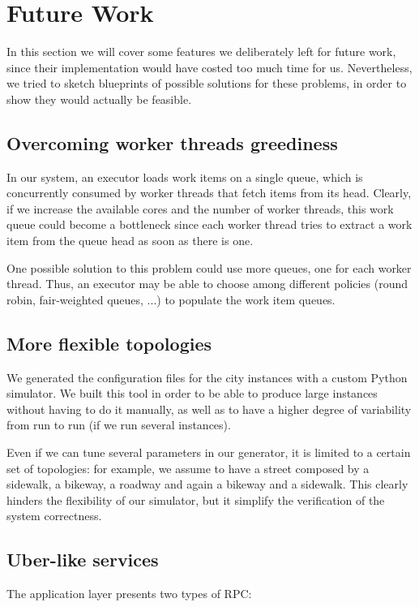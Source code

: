 \section{Future Work}
In this section we will cover some features we deliberately left for future
work, since their implementation would have costed too much time for us.
Nevertheless, we tried to sketch blueprints of possible solutions for these
problems, in order to show they would actually be feasible.

\subsection{Overcoming worker threads greediness}
In our system, an executor loads work items on a single queue, which is
concurrently consumed by worker threads that fetch items from its head.
Clearly, if we increase the available cores and the number of worker threads,
this work queue could become a bottleneck since each worker thread tries to
extract a work item from the queue head as soon as there is one.

One possible solution to this problem could use more queues, one for
each worker thread. Thus, an executor may be able to choose among
different policies (round robin, fair-weighted queues, ...) to populate the
work item queues.

\subsection{More flexible topologies}
We generated the configuration files for the city instances with a custom
Python simulator. We built this tool in order to be able to produce large
instances without having to do it manually, as well as to have a higher degree
of variability from run to run (if we run several instances).

Even if we can tune several parameters in our generator, it is limited to a
certain set of topologies: for example, we assume to have a street composed by
a sidewalk, a bikeway, a roadway and again a bikeway and a sidewalk.
This clearly hinders the flexibility of our simulator, but it simplify
the verification of the system correctness.

\subsection{Uber-like services}\label{sec:future-uber}
The application layer presents two types of RPC:

